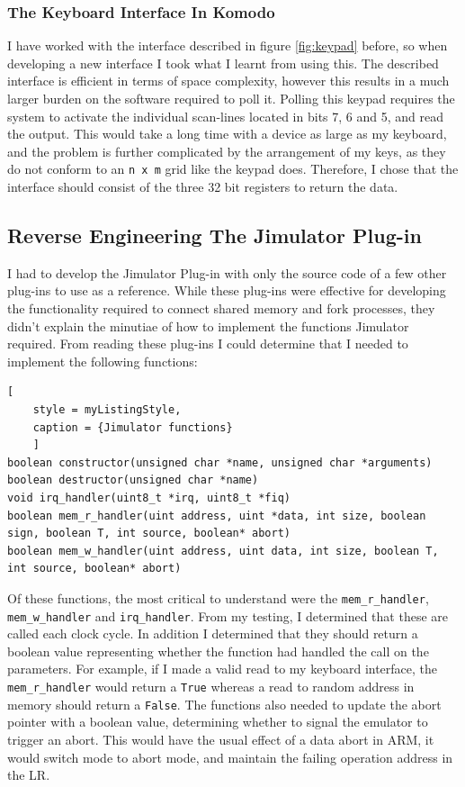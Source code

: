 \subsubsection{The Keyboard Interface In Komodo}
I have worked with the interface described in figure \ref{fig:keypad} before, so when developing a new interface I took what I learnt from using this. The described interface is efficient in terms of space complexity, however this results in a much larger burden on the software required to poll it. Polling this keypad requires the system to activate the individual scan-lines located in bits 7, 6 and 5, and read the output. This would take a long time with a device as large as my keyboard, and the problem is further complicated by the arrangement of my keys, as they do not conform to an \verb|n x m| grid like the keypad does. Therefore, I chose that the interface should consist of the three 32 bit registers to return the data. 


\subsection{Reverse Engineering The Jimulator Plug-in}
I had to develop the Jimulator Plug-in with only the source code of a few other plug-ins to use as a reference. While these plug-ins were effective for developing the functionality required to connect shared memory and fork processes, they didn't explain the minutiae of how to implement the functions Jimulator required. From reading these plug-ins I could determine that I needed to implement the following functions:
\begin{lstlisting}[
	style = myListingStyle,
	caption = {Jimulator functions}
	]
boolean constructor(unsigned char *name, unsigned char *arguments)
boolean destructor(unsigned char *name)
void irq_handler(uint8_t *irq, uint8_t *fiq)
boolean mem_r_handler(uint address, uint *data, int size, boolean sign, boolean T, int source, boolean* abort)
boolean mem_w_handler(uint address, uint data, int size, boolean T, int source, boolean* abort)
\end{lstlisting}

Of these functions, the most critical to understand were the \verb|mem_r_handler|, \verb|mem_w_handler| and \verb|irq_handler|. From my testing, I determined that these are called each clock cycle. In addition I determined that they should return a boolean value representing whether the function had handled the call on the parameters. For example, if I made a valid read to my keyboard interface, the \verb|mem_r_handler| would return a \verb|True| whereas a read to random address in memory should return a \verb|False|. The functions also needed to update the abort pointer with a boolean value, determining whether to signal the emulator to trigger an abort. This would have the usual effect of a data abort in ARM, it would switch mode to abort mode, and maintain the failing operation address in the LR.



